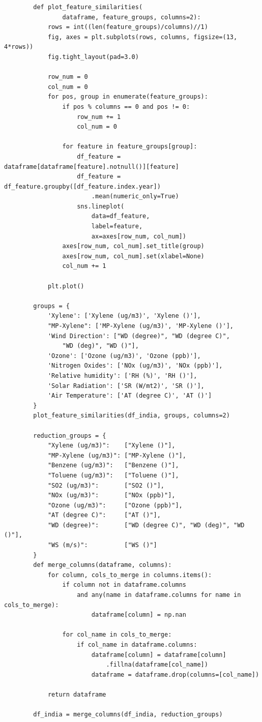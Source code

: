\documentclass[a4paper,12pt]{report}
\begin{document}
	\begin{verbatim}
		def plot_feature_similarities(
				dataframe, feature_groups, columns=2):
			rows = int((len(feature_groups)/columns)//1)
			fig, axes = plt.subplots(rows, columns, figsize=(13, 4*rows))
			fig.tight_layout(pad=3.0)
			
			row_num = 0
			col_num = 0
			for pos, group in enumerate(feature_groups):
				if pos % columns == 0 and pos != 0:
					row_num += 1
					col_num = 0
				
				for feature in feature_groups[group]:
					df_feature = dataframe[dataframe[feature].notnull()][feature]
					df_feature = df_feature.groupby([df_feature.index.year])
						.mean(numeric_only=True)
					sns.lineplot(
						data=df_feature, 
						label=feature, 
						ax=axes[row_num, col_num])
				axes[row_num, col_num].set_title(group)
				axes[row_num, col_num].set(xlabel=None)
				col_num += 1
			
			plt.plot()
		
		groups = {
			'Xylene': ['Xylene (ug/m3)', 'Xylene ()'],
			"MP-Xylene": ['MP-Xylene (ug/m3)', 'MP-Xylene ()'],
			'Wind Direction': ["WD (degree)", "WD (degree C)", 
				"WD (deg)", "WD ()"],
			'Ozone': ['Ozone (ug/m3)', 'Ozone (ppb)'],
			'Nitrogen Oxides': ['NOx (ug/m3)', 'NOx (ppb)'],
			'Relative humidity': ['RH (%)', 'RH ()'],
			'Solar Radiation': ['SR (W/mt2)', 'SR ()'],
			'Air Temperature': ['AT (degree C)', 'AT ()']
		}
		plot_feature_similarities(df_india, groups, columns=2)
		
		reduction_groups = {
			"Xylene (ug/m3)":    ["Xylene ()"],
			"MP-Xylene (ug/m3)": ["MP-Xylene ()"],
			"Benzene (ug/m3)":   ["Benzene ()"],
			"Toluene (ug/m3)":   ["Toluene ()"],
			"SO2 (ug/m3)":       ["SO2 ()"],
			"NOx (ug/m3)":       ["NOx (ppb)"],
			"Ozone (ug/m3)":     ["Ozone (ppb)"],
			"AT (degree C)":     ["AT ()"],
			"WD (degree)":       ["WD (degree C)", "WD (deg)", "WD ()"],
			"WS (m/s)":          ["WS ()"]
		}
		def merge_columns(dataframe, columns):
			for column, cols_to_merge in columns.items():
				if column not in dataframe.columns 
					and any(name in dataframe.columns for name in cols_to_merge):
						dataframe[column] = np.nan
			
				for col_name in cols_to_merge:
					if col_name in dataframe.columns:
						dataframe[column] = dataframe[column]
							.fillna(dataframe[col_name])
						dataframe = dataframe.drop(columns=[col_name])
			
			return dataframe
			
		df_india = merge_columns(df_india, reduction_groups)
	\end{verbatim}
	
\end{document}
